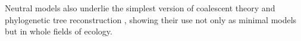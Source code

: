 Neutral models also underlie the simplest version of coalescent theory and phylogenetic tree reconstruction \cite{Kingman1982,Rice2004}, showing their use not only as minimal models but in whole fields of ecology. 

